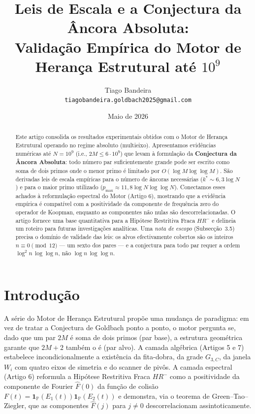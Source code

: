 \documentclass[11pt]{article}
\title{Leis de Escala e a Conjectura da Âncora Absoluta:\\ Validação Empírica do Motor de Herança Estrutural até $10^9$}
\author{Tiago Bandeira \\ \texttt{tiagobandeira.goldbach2025@gmail.com}}
\date{Maio de 2026}
\begin{document}
	
	\maketitle
	
	\begin{abstract}
		Este artigo consolida os resultados experimentais obtidos com o Motor de Herança Estrutural operando no regime absoluto (multieixo). Apresentamos evidências numéricas até $N = 10^9$ (i.e., $2M \le 6\cdot10^9$) que levam à formulação da \textbf{Conjectura da Âncora Absoluta}: todo número par suficientemente grande pode ser escrito como soma de dois primos onde o menor primo é limitado por $O(\log M \log\log M)$. São derivadas leis de escala empíricas para o número de âncoras necessárias ($k^* \sim 6,3\log N$) e para o maior primo utilizado ($p_{\max} \approx 11,8 \log N \log\log N$). Conectamos esses achados à reformulação espectral do Motor (Artigo 6), mostrando que a evidência empírica é compatível com a positividade da componente de frequência zero do operador de Koopman, enquanto as componentes não nulas são descorrelacionadas. O artigo fornece uma base quantitativa para a Hipótese Restritiva Fraca $HR^-$ e delineia um roteiro para futuras investigações analíticas. Uma \emph{nota de escopo} (Subsecção~3.5) precisa o domínio de validade das leis: os alvos efectivamente cobertos são os inteiros $n\equiv0\pmod{12}$ — um sexto dos pares — e a conjectura para todo par requer a ordem $\log^2 n\,\log\log n$, não $\log n\,\log\log n$.
	\end{abstract}
	
	\section{Introdução}
	
	A série do Motor de Herança Estrutural \cite{art1, art2, art3, art4, art5, art6, art7, art8, art9} propõe uma mudança de paradigma: em vez de tratar a Conjectura de Goldbach ponto a ponto, o motor pergunta se, dado que um par $2M$ é soma de dois primos (par base), a estrutura geométrica garante que $2M+2$ também o é (par alvo). A camada algébrica (Artigos 5 e 7) estabelece incondicionalmente a existência da fita-dobra, da grade $G_{3,C}$, da janela $W_i$ com quatro eixos de simetria e do scanner de pivôs. A camada espectral (Artigo 6) reformula a Hipótese Restritiva Fraca $HR^-$ como a positividade da componente de Fourier $\widehat{F}(0)$ da função de colisão $F(t) = \mathbf{1}_{\mathbb{P}}(E_1(t))\mathbf{1}_{\mathbb{P}}(E_2(t))$ e demonstra, via o teorema de Green–Tao–Ziegler, que as componentes $\widehat{F}(j)$ para $j\neq 0$ descorrelacionam assintoticamente.
	
\end{document}
